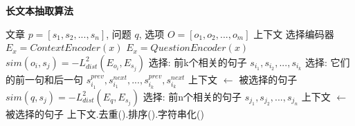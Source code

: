 
\renewcommand{\algorithmicrequire}{\textbf{输入:}}  
\renewcommand{\algorithmicensure}{\textbf{输出:}} 

\begin{algorithm}
	\caption{\textbf{长文本抽取算法}} 
	\label{alg:4-2}
	\begin{algorithmic}
		\REQUIRE 文章 $p=[s_1, s_2, ..., s_n]$, 问题 $q$, 选项 $O=[o_1, o_2, ..., o_m]$
		\ENSURE 上下文
      选择编码器
        \STATE \quad $E_x = ContextEncoder(x)$
      \ELSE
        \STATE \quad $E_x = QuestionEncoder(x)$
      \ENDIF
        \STATE \quad $sim(o_i, s_j) = -L^2_{dist}(E_{o_i}, E_{s_j})$\;
      \ENDFOR
      \STATE 选择: 前k个相关的句子 $s_{i_1}, s_{i_2}, ..., s_{i_k}$\;
      \STATE 选择: 它们的前一句和后一句 $s_{i_1}^{prev}, s_{i_1}^{next}, ..., s_{i_k}^{prev}, s_{i_k}^{next}$\;
      \STATE 上下文 $\gets$ 被选择的句子\;
        \STATE \quad $sim(q, s_j) = -L^2_{dist}(E_q, E_{s_j})$\;
      \ENDFOR
      \STATE 选择: 前n个相关的句子 $s_{j_1}, s_{j_2}, ..., s_{j_n}$\;
      \STATE 上下文 $\gets$ 被选择的句子\;
      \STATE 上下文.去重().排序().字符串化()\;
	\end{algorithmic}
\end{algorithm}


